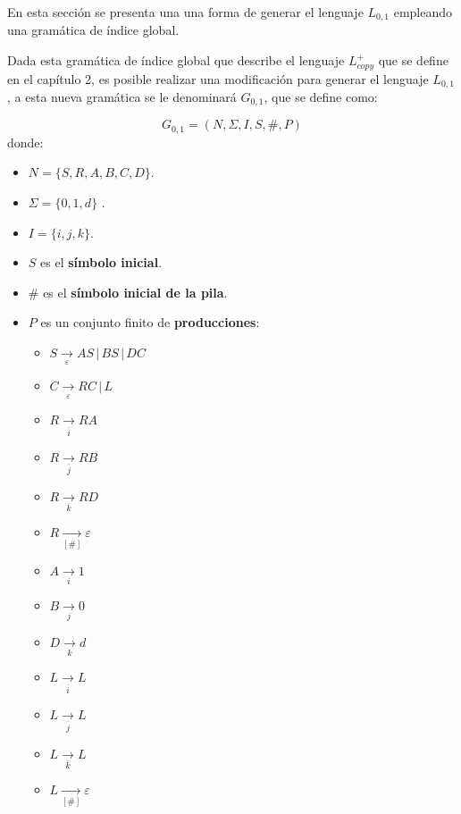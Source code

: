 En esta sección se presenta una una forma de generar el lenguaje $L_{0,1}$ empleando una gramática de índice global.

Dada esta gramática de índice global que describe el lenguaje $L_{copy}^+$ que se define en el capítulo 2, es posible realizar una modificación para generar el lenguaje
$L_{0,1}$, a esta nueva gramática se le denominará $G_{0,1}$, que se define como:

$$
    G_{0,1} = (N, \Sigma, I, S, \#, P)
$$
donde:

\begin{itemize}
    \item $N= \{S,R,A,B,C,D\}$.
    \item \( \Sigma=\{0,1,d\} \) .
    \item $I=\{i,j,k\}$.
    \item $S$ es el \textbf{símbolo inicial}.
    \item $\#$ es el \textbf{símbolo inicial de la pila}.
    \item $P$ es un conjunto finito de \textbf{producciones}:
          \begin{multicols}{2}
              \begin{itemize}
                  \item $S\underset{\varepsilon}{\to} AS\,|\,BS\,|\,DC$
                  \item $C\underset{\varepsilon}{\to} RC\,|\,L$
                  \item $R\underset{\overline{i}}{\to} RA$
                  \item $R\underset{\overline{j}}{\to} RB$
                  \item $R\underset{\overline{k}}{\to} RD$

                  \item $R\underset{[\#]}{\to} \varepsilon$
                  \item $A\underset{i}{\to} 1$
                  \item $B\underset{j}{\to} 0$
                  \item $D\underset{k}{\to} d$
                  \item $L\underset{\overline{i}}{\to} L$
                  \item $L\underset{\overline{j}}{\to} L$
                  \item $L\underset{\overline{k}}{\to} L$
                  \item $L\underset{[\#]}{\to} \varepsilon$
              \end{itemize}
          \end{multicols}
\end{itemize}

